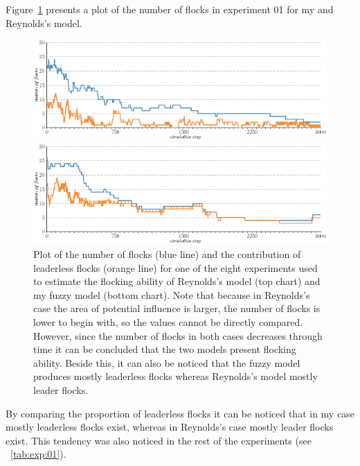 Figure~\ref{chart:exp:01:01:flocks} presents a plot of the number of flocks in experiment 01 for my and Rey\-nol\-ds's model. 
%
\begin{figure}
\null\vspace*{2mm}
\includegraphics{chart[exp0101flocks]cwr}
\par\vspace*{2mm}
\includegraphics{chart[exp0101flocks]afd}
\par\vspace*{2mm}
\caption{Plot of the number of flocks (blue line) and the contribution of leaderless flocks (orange line) for one of the eight experiments used to estimate the flocking ability of Reynolds's model \cite{reynolds:1999} (top chart) and my fuzzy model (bottom chart). Note that because in Reynolds's case the area of potential influence is larger, the number of flocks is lower to begin with, so the values cannot be directly compared. However, since the number of flocks in both cases decreases through time it can be concluded that the two models present flocking ability. Beside this, it can also be noticed that the fuzzy model produces mostly leaderless flocks whereas Reynolds's model mostly leader flocks.}
\label{chart:exp:01:01:flocks}
\end{figure}
%
By comparing the proportion of leaderless flocks it can be noticed that in my case mostly leaderless flocks exist, whereas in Reynolds's case mostly leader flocks exist. This tendency was also noticed in the rest of the experiments (see \tab~\ref{tab:exp:01}). 

